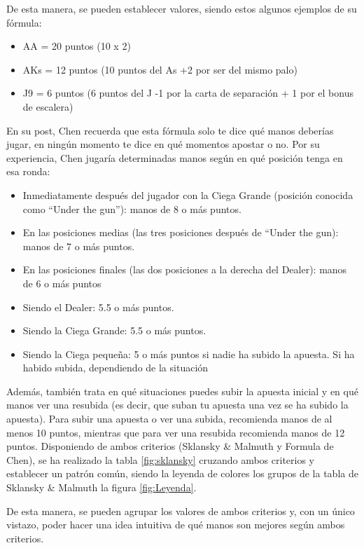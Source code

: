 De esta manera, se pueden establecer valores, siendo estos algunos ejemplos de su fórmula:
\begin{itemize}
\item AA = 20 puntos (10 x 2)
\item AKs = 12 puntos (10 puntos del As +2 por ser del mismo palo)
\item J9 = 6 puntos (6 puntos del J -1 por la carta de separación + 1 por el bonus de escalera)
\end{itemize}

En su post, Chen recuerda que esta fórmula solo te dice qué manos deberías jugar, en ningún momento te dice en qué momentos apostar o no. Por su experiencia, Chen jugaría determinadas manos según en qué posición tenga en esa ronda:

\begin{itemize}
\item Inmediatamente después del jugador con la Ciega Grande (posición conocida como “Under the gun”): manos de 8 o más puntos. 
\item En las posiciones medias (las tres posiciones después de “Under the gun): manos de 7 o más puntos.
\item En las posiciones finales (las dos posiciones a la derecha del Dealer): manos de 6 o más puntos
\item Siendo el Dealer: 5.5 o más puntos.
\item Siendo la Ciega Grande: 5.5 o más puntos.
\item Siendo la Ciega pequeña: 5 o más puntos si nadie ha subido la apuesta. Si ha habido subida, dependiendo de la situación
\end{itemize}


Además, también trata en qué situaciones puedes subir la apuesta inicial y en qué manos ver una resubida (es decir, que suban tu apuesta una vez se ha subido la apuesta). Para subir una apuesta o ver una subida, recomienda manos de al menos 10 puntos, mientras que para ver una resubida recomienda manos de 12 puntos.
Disponiendo de ambos criterios (Sklansky \& Malmuth y Formula de Chen), se ha realizado la tabla \ref{fig:sklansky} cruzando ambos criterios y establecer un patrón común, siendo la leyenda de colores los grupos de la tabla de Sklansky \& Malmuth la figura \ref{fig:Leyenda}.

De esta manera, se pueden agrupar los valores de ambos criterios y, con un único vistazo, poder hacer una idea intuitiva de qué manos son mejores según ambos criterios. 


